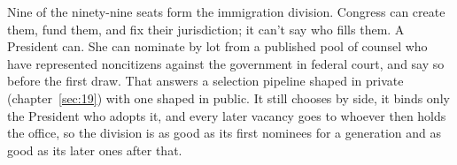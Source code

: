 Nine of the ninety-nine seats form the immigration division. Congress can create them, fund them, and fix their jurisdiction; it can't say who fills them. A President can. She can nominate by lot from a published pool of counsel who have represented noncitizens against the government in federal court, and say so before the first draw. That answers a selection pipeline shaped in private (chapter~\ref{sec:19}) with one shaped in public. It still chooses by side, it binds only the President who adopts it, and every later vacancy goes to whoever then holds the office, so the division is as good as its first nominees for a generation and as good as its later ones after that.
